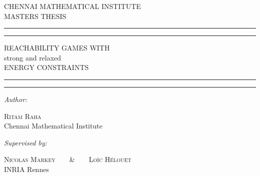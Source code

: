 \documentclass[a4paper,12pt, twoside]{book}
\theoremstyle{definition}
\begin{document}
\begin{titlepage}
	\centering
	\scshape 
	{\LARGE{CHENNAI MATHEMATICAL INSTITUTE}}\\
          \vskip 0.5cm
	MASTERS THESIS
	\vspace*{\baselineskip} 
	
	\rule{\textwidth}{1.6pt}\vspace*{-\baselineskip}\vspace*{2pt}
	\rule{\textwidth}{0.4pt} 

	\vspace{0.75\baselineskip}
	
	{\LARGE REACHABILITY GAMES WITH\\ strong and relaxed \\ ENERGY CONSTRAINTS\\} 
	
	\vspace{0.75\baselineskip} 
	
	\rule{\textwidth}{0.4pt}\vspace*{-\baselineskip}\vspace{3.2pt} 
	\rule{\textwidth}{1.6pt}
	
	\vspace{2\baselineskip} 
	
	
	
	
	\textit{Author:}
	
	\vspace{0.5\baselineskip} 
	
	{\scshape\Large Ritam Raha}\\ %
	\vspace{0.2\baselineskip}
	{\small Chennai Mathematical Institute}
	\vspace{2\baselineskip} 

		
	\textit{Supervised by:}     
	\vspace{0.5\baselineskip}

	{\scshape\Large Nicolas Markey}\ \ \ \ \&\ \ \ \  {\scshape\Large Loïc Hélouët}\\ %
	\vspace{0.2\baselineskip}
	{\small INRIA Rennes}
	\vspace{2\baselineskip}

	\vspace{2\baselineskip} 
	

\end{titlepage}
\end{document}
